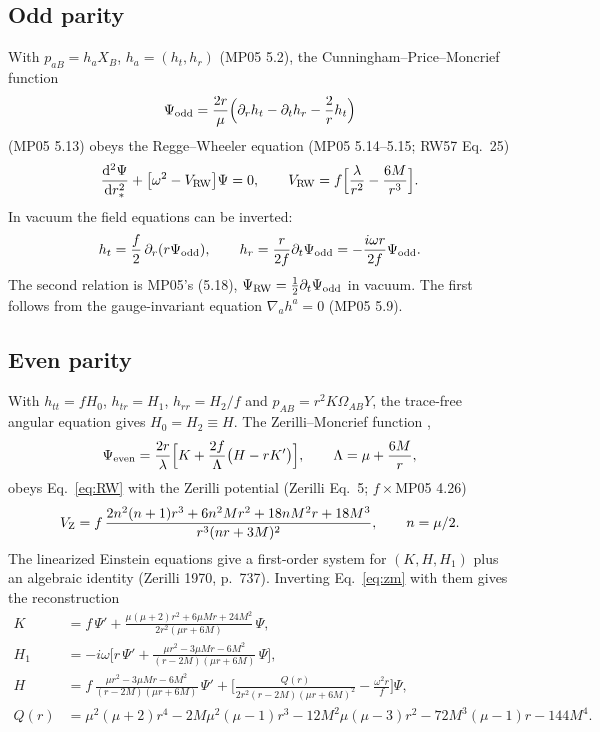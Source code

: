 \documentclass[11pt,a4paper]{article}
\numberwithin{equation}{section}
\newcommand{\dd}{\mathrm{d}}
\begin{document}
\subsection{Odd parity}
With $p_{aB}=h_aX_B$, $h_a=(h_t,h_r)$ (MP05 5.2), the Cunningham--Price--Moncrief function \cite{CPM78}
\begin{equation}
\Psi_{\rm odd}=\frac{2r}{\mu}\Big(\partial_rh_t-\partial_th_r-\frac2rh_t\Big)
\label{eq:cpm}
\end{equation}
(MP05 5.13) obeys the Regge--Wheeler equation (MP05 5.14--5.15; RW57 Eq.~25)
\begin{equation}
\frac{\dd^2\Psi}{\dd r_*^2}+\big[\omega^2-V_{\rm RW}\big]\Psi=0,\qquad V_{\rm RW}=f\Big[\frac{\lambda}{r^2}-\frac{6M}{r^3}\Big].
\label{eq:RW}
\end{equation}
In vacuum the field equations can be inverted:
\begin{equation}
h_t=\frac f2\,\partial_r(r\Psi_{\rm odd}),\qquad h_r=\frac{r}{2f}\partial_t\Psi_{\rm odd}=-\frac{i\omega r}{2f}\Psi_{\rm odd}.
\label{eq:oddrecon}
\end{equation}
The second relation is MP05's (5.18), $\Psi_{\rm RW}=\tfrac12\partial_t\Psi_{\rm odd}$ in vacuum. The first follows
from the gauge-invariant equation $\nabla_ah^a=0$ (MP05 5.9).

\subsection{Even parity}
With $h_{tt}=fH_0$, $h_{tr}=H_1$, $h_{rr}=H_2/f$ and $p_{AB}=r^2K\Omega_{AB}Y$, the trace-free angular equation gives
$H_0=H_2\equiv H$. The Zerilli--Moncrief function \cite{Moncrief74,MP05},
\begin{equation}
\Psi_{\rm even}=\frac{2r}{\lambda}\Big[K+\frac{2f}{\Lambda}\big(H-rK'\big)\Big],\qquad \Lambda=\mu+\frac{6M}{r},
\label{eq:zm}
\end{equation}
obeys Eq.~\eqref{eq:RW} with the Zerilli potential (Zerilli Eq.~5; $f\times$MP05 4.26)
\begin{equation}
V_{\rm Z}=f\,\frac{2n^2(n+1)r^3+6n^2Mr^2+18nM^2r+18M^3}{r^3(nr+3M)^2},\qquad n=\mu/2 .
\label{eq:VZ}
\end{equation}
The linearized Einstein equations give a first-order system for $(K,H,H_1)$ plus an algebraic identity (Zerilli 1970,
p.~737). Inverting Eq.~\eqref{eq:zm} with them gives the reconstruction
\begin{align}
K&=f\,\Psi'+\frac{\mu(\mu+2)r^2+6\mu Mr+24M^2}{2r^2(\mu r+6M)}\,\Psi,\label{eq:Krec}\\
H_1&=-i\omega\Big[r\,\Psi'+\frac{\mu r^2-3\mu Mr-6M^2}{(r-2M)(\mu r+6M)}\,\Psi\Big],\\
H&=f\,\frac{\mu r^2-3\mu Mr-6M^2}{(r-2M)(\mu r+6M)}\,\Psi'+\Big[\frac{Q(r)}{2r^2(r-2M)(\mu r+6M)^2}-\frac{\omega^2r}{f}\Big]\Psi,
\label{eq:Hrec}\\
Q(r)&=\mu^2(\mu+2)r^4-2M\mu^2(\mu-1)r^3-12M^2\mu(\mu-3)r^2-72M^3(\mu-1)r-144M^4.\nonumber
\end{align}
\end{document}
